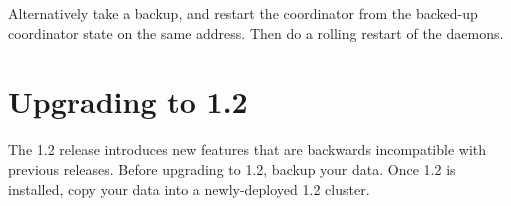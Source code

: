 Alternatively take a backup, and restart the coordinator from the backed-up
coordinator state on the same address.  Then do a rolling restart of the
daemons.

\section{Upgrading to 1.2}
\label{sec:installation:upgrade1.2}

The 1.2 release introduces new features that are backwards incompatible with
previous releases.  Before upgrading to 1.2, backup your data.  Once 1.2 is
installed, copy your data into a newly-deployed 1.2 cluster.
